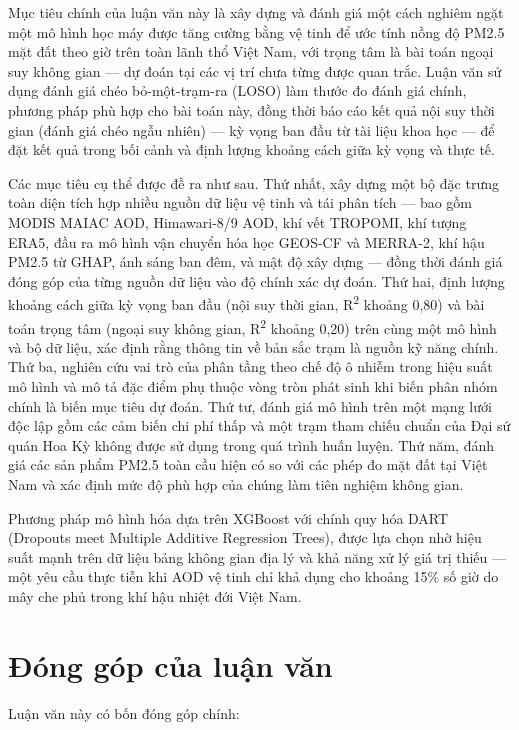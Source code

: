 Mục tiêu chính của luận văn này là xây dựng và đánh giá một cách nghiêm ngặt một mô hình học máy được tăng cường bằng vệ tinh để ước tính nồng độ PM2.5 mặt đất theo giờ trên toàn lãnh thổ Việt Nam, với trọng tâm là bài toán ngoại suy không gian --- dự đoán tại các vị trí chưa từng được quan trắc. Luận văn sử dụng đánh giá chéo bỏ-một-trạm-ra (LOSO) làm thước đo đánh giá chính, phương pháp phù hợp cho bài toán này, đồng thời báo cáo kết quả nội suy thời gian (đánh giá chéo ngẫu nhiên) --- kỳ vọng ban đầu từ tài liệu khoa học --- để đặt kết quả trong bối cảnh và định lượng khoảng cách giữa kỳ vọng và thực tế.

Các mục tiêu cụ thể được đề ra như sau. Thứ nhất, xây dựng một bộ đặc trưng toàn diện tích hợp nhiều nguồn dữ liệu vệ tinh và tái phân tích --- bao gồm MODIS MAIAC AOD, Himawari-8/9 AOD, khí vết TROPOMI, khí tượng ERA5, đầu ra mô hình vận chuyển hóa học GEOS-CF và MERRA-2, khí hậu PM2.5 từ GHAP, ánh sáng ban đêm, và mật độ xây dựng --- đồng thời đánh giá đóng góp của từng nguồn dữ liệu vào độ chính xác dự đoán. Thứ hai, định lượng khoảng cách giữa kỳ vọng ban đầu (nội suy thời gian, R\textsuperscript{2} khoảng 0,80) và bài toán trọng tâm (ngoại suy không gian, R\textsuperscript{2} khoảng 0,20) trên cùng một mô hình và bộ dữ liệu, xác định rằng thông tin về bản sắc trạm là nguồn kỹ năng chính. Thứ ba, nghiên cứu vai trò của phân tầng theo chế độ ô nhiễm trong hiệu suất mô hình và mô tả đặc điểm phụ thuộc vòng tròn phát sinh khi biến phân nhóm chính là biến mục tiêu dự đoán. Thứ tư, đánh giá mô hình trên một mạng lưới độc lập gồm các cảm biến chi phí thấp và một trạm tham chiếu chuẩn của Đại sứ quán Hoa Kỳ không được sử dụng trong quá trình huấn luyện. Thứ năm, đánh giá các sản phẩm PM2.5 toàn cầu hiện có so với các phép đo mặt đất tại Việt Nam và xác định mức độ phù hợp của chúng làm tiên nghiệm không gian.

Phương pháp mô hình hóa dựa trên XGBoost với chính quy hóa DART (Dropouts meet Multiple Additive Regression Trees), được lựa chọn nhờ hiệu suất mạnh trên dữ liệu bảng không gian địa lý và khả năng xử lý giá trị thiếu --- một yêu cầu thực tiễn khi AOD vệ tinh chỉ khả dụng cho khoảng 15\% số giờ do mây che phủ trong khí hậu nhiệt đới Việt Nam.


\section{Đóng góp của luận văn}

Luận văn này có bốn đóng góp chính:

